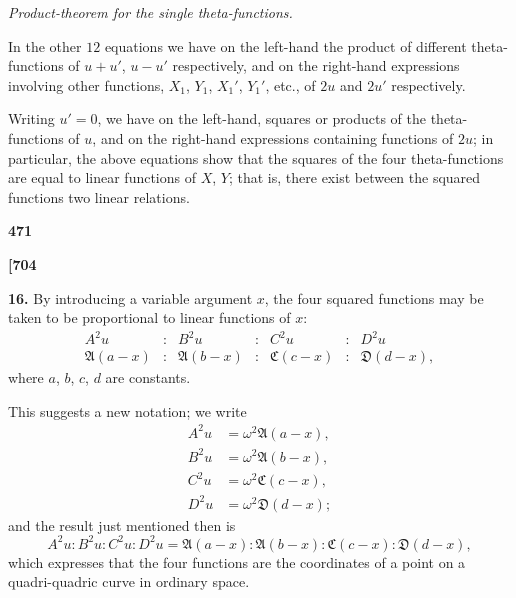 \documentclass[12pt,a4paper]{article}
\theoremstyle{definition}
\begin{document}
\vspace{1em}

\textit{Product-theorem for the single theta-functions.}

\noindent In the other $12$ equations we have on the left-hand the product of different theta-functions of $u + u'$, $u - u'$ respectively, and on the right-hand expressions involving other functions, $X_1$, $Y_1$, $X_1'$, $Y_1'$, etc., of $2u$ and $2u'$ respectively.

Writing $u' = 0$, we have on the left-hand, squares or products of the theta-functions of $u$, and on the right-hand expressions containing functions of $2u$; in particular, the above equations show that the squares of the four theta-functions are equal to linear functions of $X$, $Y$; that is, there exist between the squared functions two linear relations.

\vspace{1em}

\begin{center}
\textbf{471}
\end{center}

\vspace{0.5em}

\noindent\textbf{[704}

\vspace{0.5em}

\noindent\textbf{16.}\quad
By introducing a variable argument $x$, the four squared functions may be taken to be proportional to linear functions of $x$:
\[
\begin{matrix}
A^2 u & : & B^2 u & : & C^2 u & : & D^2 u \\
\mathfrak{A}(a - x) & : & \mathfrak{A}(b - x) & : & \mathfrak{C}(c - x) & : & \mathfrak{D}(d - x),
\end{matrix}
\]
where $a$, $b$, $c$, $d$ are constants.

This suggests a new notation; we write
\begin{align*}
A^2 u &= \omega^2 \mathfrak{A}(a - x), \\
B^2 u &= \omega^2 \mathfrak{A}(b - x), \\
C^2 u &= \omega^2 \mathfrak{C}(c - x), \\
D^2 u &= \omega^2 \mathfrak{D}(d - x);
\end{align*}
and the result just mentioned then is
\[
A^2 u : B^2 u : C^2 u : D^2 u = \mathfrak{A}(a - x) : \mathfrak{A}(b - x) : \mathfrak{C}(c - x) : \mathfrak{D}(d - x),
\]
which expresses that the four functions are the coordinates of a point on a quadri-quadric curve in ordinary space.
\end{document}
